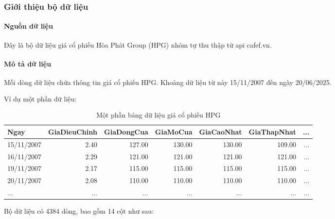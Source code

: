 \subsubsection{Giới thiệu bộ dữ liệu}
    \paragraph{Nguồn dữ liệu}
    \leavevmode

    Đây là bộ dữ liệu giá cổ phiếu Hòa Phát Group (HPG) nhóm tự thu thập từ api cafef.vn.

    \paragraph{Mô tả dữ liệu}
    \leavevmode
    Mỗi dòng dữ liệu chứa thông tin giá cổ phiếu HPG. Khoảng dữ liệu từ này 15/11/2007 đến ngày 20/06/2025.

    Ví dụ một phần dữ liệu:

    \begin{table}[htbp]
    \centering
    \caption{Một phần bảng dữ liệu giá cổ phiếu HPG}
    \label{tab:stat-stock-exp}
        \begin{tabular}{|l|r|r|r|r|r|r|}
        \hline
        Ngay & GiaDieuChinh & GiaDongCua & GiaMoCua & GiaCaoNhat & GiaThapNhat & ... \\
        \hline
        15/11/2007 & 2.40 & 127.00 & 130.00 & 130.00 & 109.00 & ... \\
        \hline
        16/11/2007 & 2.29 & 121.00 & 121.00 & 121.00 & 121.00 & ... \\
        \hline
        19/11/2007 & 2.17 & 115.00 & 115.00 & 115.00 & 115.00 & ... \\
        \hline
        20/11/2007 & 2.08 & 110.00 & 110.00 & 110.00 & 110.00 & ... \\
        \hline
        ... & ... & ... & ... & ... & ... & ... \\
        \hline
        \end{tabular}

    \end{table}

     Bộ dữ liệu có 4384 dòng, bao gồm 14  cột như sau:

